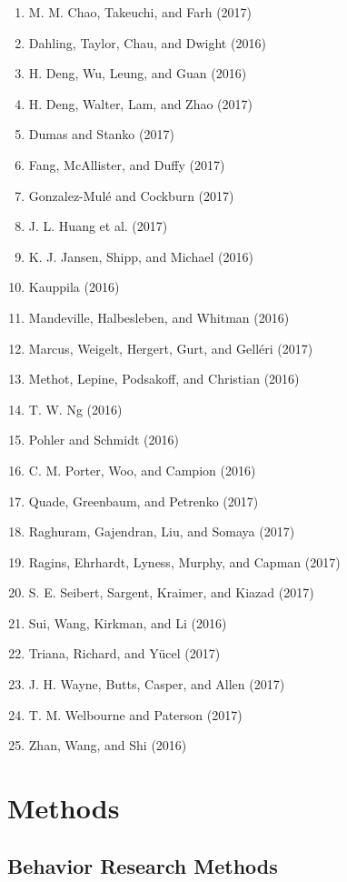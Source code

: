 \documentclass[english,man]{apa6}
\providecommand{\tightlist}{%
  \setlength{\itemsep}{0pt}\setlength{\parskip}{0pt}}
\theoremstyle{definition}
\theoremstyle{definition}
\theoremstyle{definition}
\theoremstyle{remark}
\begin{document}
\begin{enumerate}
\def\labelenumi{\arabic{enumi})}
\tightlist
\item
  M. M. Chao, Takeuchi, and Farh (2017)
\item
  Dahling, Taylor, Chau, and Dwight (2016)
\item
  H. Deng, Wu, Leung, and Guan (2016)
\item
  H. Deng, Walter, Lam, and Zhao (2017)
\item
  Dumas and Stanko (2017)
\item
  Fang, McAllister, and Duffy (2017)
\item
  Gonzalez-Mulé and Cockburn (2017)
\item
  J. L. Huang et al. (2017)
\item
  K. J. Jansen, Shipp, and Michael (2016)
\item
  Kauppila (2016)
\item
  Mandeville, Halbesleben, and Whitman (2016)
\item
  Marcus, Weigelt, Hergert, Gurt, and Gelléri (2017)
\item
  Methot, Lepine, Podsakoff, and Christian (2016)
\item
  T. W. Ng (2016)
\item
  Pohler and Schmidt (2016)
\item
  C. M. Porter, Woo, and Campion (2016)
\item
  Quade, Greenbaum, and Petrenko (2017)
\item
  Raghuram, Gajendran, Liu, and Somaya (2017)
\item
  Ragins, Ehrhardt, Lyness, Murphy, and Capman (2017)
\item
  S. E. Seibert, Sargent, Kraimer, and Kiazad (2017)
\item
  Sui, Wang, Kirkman, and Li (2016)
\item
  Triana, Richard, and Yücel (2017)
\item
  J. H. Wayne, Butts, Casper, and Allen (2017)
\item
  T. M. Welbourne and Paterson (2017)
\item
  Zhan, Wang, and Shi (2016)
\end{enumerate}

\section{Methods}\label{methods}

\subsection{Behavior Research Methods}\label{behavior-research-methods}
\end{document}
